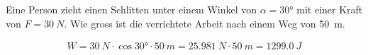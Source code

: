 
\begin{aufgabe}
Eine Person zieht einen Schlitten unter einem Winkel von \(\alpha = \ang{30}\) mit einer
Kraft von \(F=\SI{30}{N}\). Wie gross ist die verrichtete Arbeit nach einem Weg von \SI{50}{m}.
\begin{loesung}
	\begin{eqnarray*}
	W = \SI{30}{N} \cdot \cos\ang{30} \cdot \SI{50}{m} = \SI{25.981}{N}\cdot\SI{50}{m}=\SI{1299.0}{J}
	\end{eqnarray*}
\end{loesung}
\end{aufgabe}

